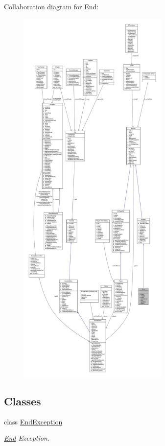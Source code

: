 Collaboration diagram for End\+:
\nopagebreak
\begin{figure}[H]
\begin{center}
\leavevmode
\includegraphics[height=550pt]{class_end__coll__graph}
\end{center}
\end{figure}
\subsection*{Classes}
\begin{DoxyCompactItemize}
\item 
class \hyperlink{class_end_1_1_end_exception}{End\+Exception}
\begin{DoxyCompactList}\small\item\em \hyperlink{class_end}{End} Exception. \end{DoxyCompactList}\end{DoxyCompactItemize}
